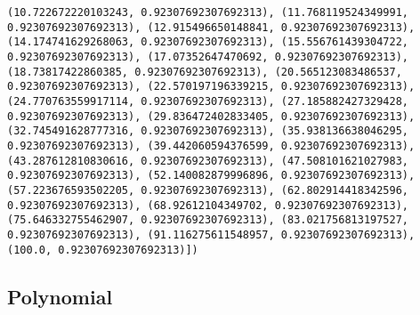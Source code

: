 \documentclass[11pt]{article}
\begin{document}
\begin{Verbatim}[commandchars=\\\{\}]
(10.722672220103243, 0.92307692307692313), (11.768119524349991, 0.92307692307692313), (12.915496650148841, 0.92307692307692313), (14.174741629268063, 0.92307692307692313), (15.556761439304722, 0.92307692307692313), (17.07352647470692, 0.92307692307692313), (18.73817422860385, 0.92307692307692313), (20.565123083486537, 0.92307692307692313), (22.570197196339215, 0.92307692307692313), (24.770763559917114, 0.92307692307692313), (27.185882427329428, 0.92307692307692313), (29.836472402833405, 0.92307692307692313), (32.745491628777316, 0.92307692307692313), (35.938136638046295, 0.92307692307692313), (39.442060594376599, 0.92307692307692313), (43.287612810830616, 0.92307692307692313), (47.508101621027983, 0.92307692307692313), (52.140082879996896, 0.92307692307692313), (57.223676593502205, 0.92307692307692313), (62.802914418342596, 0.92307692307692313), (68.92612104349702, 0.92307692307692313), (75.646332755462907, 0.92307692307692313), (83.021756813197527, 0.92307692307692313), (91.116275611548957, 0.92307692307692313), (100.0, 0.92307692307692313)])

    \end{Verbatim}

    \hypertarget{polynomial}{%
\subsection{Polynomial}\label{polynomial}}
\end{document}
